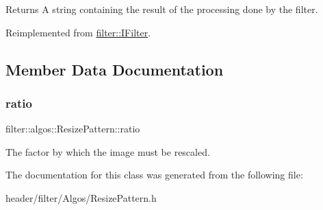 \begin{DoxyReturn}{Returns}
A string containing the result of the processing done by the filter. 
\end{DoxyReturn}


Reimplemented from \hyperlink{classfilter_1_1_i_filter_ab99902b060a6d9edc3452a8c9f85e37e}{filter\+::\+I\+Filter}.



\subsection{Member Data Documentation}
\mbox{\label{classfilter_1_1algos_1_1_resize_pattern_a494ee492bb4ffdb81d478c6e1fc611a5}} 
\subsubsection{\texorpdfstring{ratio}{ratio}}
{\footnotesize\ttfamily filter\+::algos\+::\+Resize\+Pattern\+::ratio}

The factor by which the image must be rescaled. 

The documentation for this class was generated from the following file\+:\begin{DoxyCompactItemize}
\item 
header/filter/\+Algos/Resize\+Pattern.\+h\end{DoxyCompactItemize}
